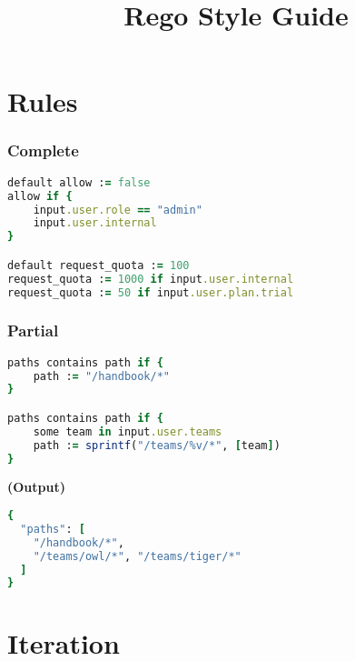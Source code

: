 \documentclass[twocolumn]{article}
\makeatletter
\renewcommand{\maketitle}{\bgroup\setlength{\parindent}{0pt}
  \textbf{\LARGE{\@title}}
}
\makeatother
\begin{document}
\title{Rego Style Guide}

\maketitle
\vspace{-1em}


\section*{Rules}




\vspace{-1em}
\subsubsection*{Complete}

\begin{lstlisting}[language=Ruby]
default allow := false
allow if {
	input.user.role == "admin"
	input.user.internal
}

default request_quota := 100
request_quota := 1000 if input.user.internal
request_quota := 50 if input.user.plan.trial
\end{lstlisting}





\vspace{-1em}
\subsubsection*{Partial}

\begin{lstlisting}[language=Ruby]
paths contains path if {
	path := "/handbook/*"
}

paths contains path if {
	some team in input.user.teams
	path := sprintf("/teams/%v/*", [team])
}
\end{lstlisting}



\textbf{\tiny{(Output)}}
\begin{lstlisting}[language=Ruby]
{
  "paths": [
    "/handbook/*",
    "/teams/owl/*", "/teams/tiger/*"
  ]
}
\end{lstlisting}




\section*{Iteration}
\end{document}
